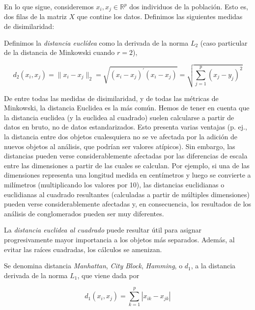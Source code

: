 En lo que sigue, consideremos $x_{i}, x_{j} \in \mathbb{R}^{p}$ dos individuos de la población. Esto es, dos filas de la matriz $X$ que contine los datos. 
Definimos las siguientes medidas de disimilaridad:

\begin{definicion}

Definimos la \textit{distancia euclídea} como la derivada de la norma $L_{2}$ (caso particular de la distancia de Minkowski cuando $r=2$), 

\[
d_{2}(x_{i},x_{j}) = \|x_{i} - x_{j}\|_{2} = \sqrt{(x_{i}-x_{j})^{'}(x_{i}-x_{j})} = \sqrt{\sum_{j=1}^{p}(x_{j}-y_{j})^{2}}
\] 

\end{definicion}


De entre todas las medidas de disimilaridad, y de todas las métricas de Minkowski, la distancia Euclidea es la más común. Hemos de tener en cuenta que la 
distancia euclidea (y la euclidea al cuadrado) suelen calcularse a partir de datos en bruto, 
no de datos estandarizados. Esto presenta varias ventajas (p. ej., la distancia entre dos objetos cualesquiera no se ve afectada por la adición de nuevos objetos 
al análisis, que podrían ser valores atípicos). Sin embargo, las distancias pueden verse considerablemente afectadas por las diferencias de escala entre las 
dimensiones a partir de las cuales se calculan.  Por ejemplo, si una de las dimensiones representa una longitud medida en centímetros y luego se convierte a milímetros (multiplicando los 
valores por 10), las distancias euclidianas o euclidianas al cuadrado resultantes (calculadas a partir de múltiples dimensiones) pueden verse considerablemente 
afectadas y, en consecuencia, los resultados de los análisis de conglomerados pueden ser muy diferentes. \newline


\begin{observacion}
La \textit{distancia euclidea al cuadrado} puede resultar útil para asignar progresivamente mayor importancia a los objetos más separados. Además, al evitar las
raíces cuadradas, los cálculos se amenizan.
\end{observacion}


\begin{definicion}

    Se denomina distancia \textit{Manhattan}, \textit{City Block}, \textit{Hamming}, o \textit{$d_{1}$}, a la distancia derivada de la norma $L_{1}$, que viene dada por
    
    \[
    d_{1}(x_{i},x_{j}) = \sum_{k=1}^{p} |x_{ik}-x_{jk}|
    \]
    
\end{definicion}

